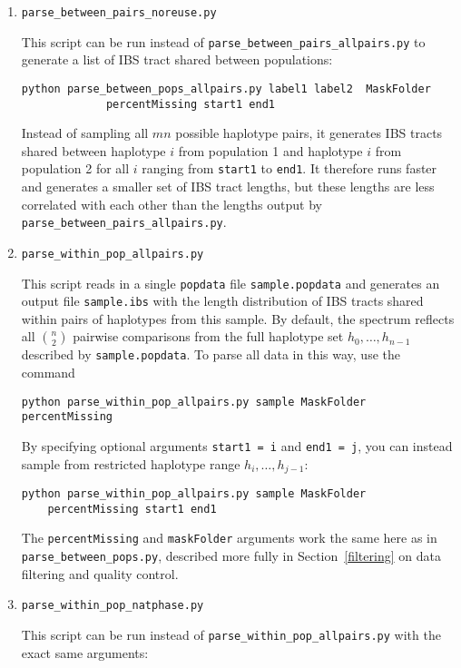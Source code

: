 \documentclass[12pt]{article}
\begin{document}
\begin{enumerate}
\item \verb|parse_between_pairs_noreuse.py|

This script can be run instead of \verb|parse_between_pairs_allpairs.py| to generate a list of IBS tract shared between populations:


\begin{Verbatim}
python parse_between_pops_allpairs.py label1 label2  MaskFolder 
			 percentMissing start1 end1
\end{Verbatim}
 Instead of sampling all  $mn$ possible haplotype pairs, it generates IBS tracts shared between haplotype $i$ from population 1 and haplotype $i$ from population 2 for all $i$ ranging from \texttt{start1} to \texttt{end1}. It therefore runs faster and generates a smaller set of IBS tract lengths, but these lengths are less correlated with each other than the lengths output by \verb|parse_between_pairs_allpairs.py|.

\item \verb|parse_within_pop_allpairs.py|

This script reads in a single \texttt{popdata} file \texttt{sample.popdata} and generates an output file \texttt{sample.ibs} with the length distribution of IBS tracts shared within pairs of haplotypes from this sample. By default, the spectrum reflects all $\binom{n}{2}$ pairwise comparisons from the full haplotype set $h_0,\ldots,h_{n-1}$ described by \texttt{sample.popdata}. To parse all data in this way, use the command

\begin{verbatim}
python parse_within_pop_allpairs.py sample MaskFolder percentMissing
\end{verbatim}

By specifying optional arguments \texttt{start1 = i} and \texttt{end1 = j}, you can instead sample from restricted haplotype range $h_i,\ldots,h_{j-1}$: 

\begin{Verbatim}
python parse_within_pop_allpairs.py sample MaskFolder 
	percentMissing start1 end1
\end{Verbatim}


The \texttt{percentMissing} and \texttt{maskFolder} arguments work the same here as in \verb|parse_between_pops.py|, described more fully in Section~\ref{filtering} on data filtering and quality control.

\item \verb|parse_within_pop_natphase.py|

This script can be run instead of \verb|parse_within_pop_allpairs.py| with the exact same arguments: 


\end{enumerate}
\end{document}
